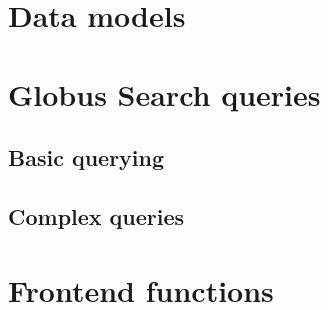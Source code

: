 \documentclass{report}
\begin{document}
\chapter{Data models}


\chapter{Globus Search queries}
\section{Basic querying}
\section{Complex queries}

\chapter{Frontend functions}

\end{document}
